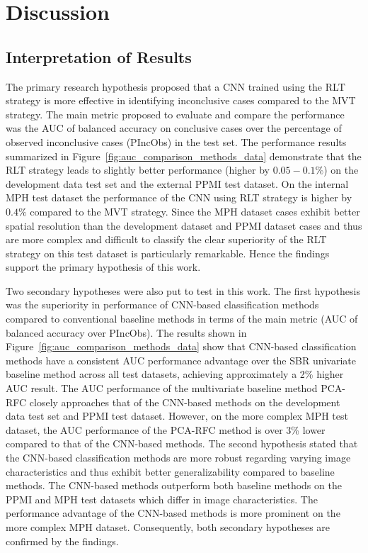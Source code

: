 \section{Discussion}
\label{sec:discussion}

\subsection{Interpretation of Results}

The primary research hypothesis proposed that a CNN trained using the RLT strategy
is more effective in identifying inconclusive cases compared to the MVT strategy.
The main metric proposed to evaluate and compare the performance was the
AUC of balanced accuracy on conclusive cases over the percentage of observed inconclusive cases (PIncObs) in the test set.
The performance results summarized in Figure~\ref{fig:auc_comparison_methods_data} demonstrate 
that the RLT strategy leads to slightly better performance (higher by $0.05-0.1\%$) on the development data test set 
and the external PPMI test dataset.
On the internal MPH test dataset the performance of the CNN using RLT strategy is higher by $0.4\%$ compared to the MVT strategy.
Since the MPH dataset cases exhibit better spatial resolution than the development dataset and PPMI dataset cases
and thus are more complex and difficult to classify 
the clear superiority of the RLT strategy on this test dataset is particularly remarkable.
Hence the findings support the primary hypothesis of this work.

Two secondary hypotheses were also put to test in this work.
The first hypothesis was the superiority in performance of CNN-based classification methods compared to 
conventional baseline methods in terms of the main metric (AUC of balanced accuracy over PIncObs).
The results shown in Figure~\ref{fig:auc_comparison_methods_data} show that CNN-based classification methods
have a consistent AUC performance advantage over the SBR univariate baseline method across all test datasets, 
achieving approximately a 2\% higher AUC result.
The AUC performance of the multivariate baseline method PCA-RFC closely approaches that of the CNN-based methods 
on the development data test set and PPMI test dataset.
However, on the more complex MPH test dataset, the AUC performance of the PCA-RFC method is over 3\% lower
compared to that of the CNN-based methods.
The second hypothesis stated that the CNN-based classification methods are 
more robust regarding varying image characteristics and thus exhibit better generalizability compared to baseline methods.
The CNN-based methods outperform both baseline methods on the PPMI and MPH test datasets which differ in image characteristics.
The performance advantage of the CNN-based methods is more prominent on the more complex MPH dataset.
Consequently, both secondary hypotheses are confirmed by the findings.


